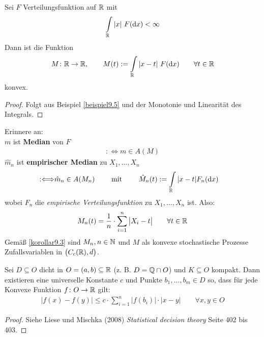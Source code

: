 \begin{lemma}\label{lemma9.6}
	Sei $F$ Verteilungsfunktion auf $\mathbb{R}$ mit
	\begin{align*}
		\int\limits_{\mathbb{R}} |x|~F(\mathrm{d} x)<\infty
	\end{align*}
	Dann ist die Funktion
	\begin{align*}
		M\colon\mathbb{R}\to\mathbb{R},\qquad M(t):=\int\limits_{\mathbb{R}}|x-t|~F(\mathrm{d} x)\qquad\forall t\in\mathbb{R}
	\end{align*}
	konvex.
\end{lemma}

\begin{proof}
	Folgt aus Beispiel \ref{beispiel9.5} und der Monotonie und Linearität des Integrals.
\end{proof}

Erinnere an:\\
$m$ ist \textbf{Median} von $F$
\begin{align*}
	:\Longleftrightarrow m\in A(M)
\end{align*}
$\hat{m}_n$ ist \textbf{empirischer Median} zu $X_1,\ldots,X_n$
\begin{align*}
	:\Longleftrightarrow&\hat{m}_n\in A(M_n)
	\qquad\text{ mit }\qquad
	\hat{M}_n(t):=\int\limits_{\mathbb{R}}|x-t| F_n(\mathrm{d} x)
\end{align*}
wobei $F_n$ die \textit{empirische Verteilungsfunktion} zu $X_1,\ldots,X_n$ ist.
Also:
\begin{align*}
	M_n(t)=\frac{1}{n}\cdot\sum\limits_{i=1}^n\big|X_i-t\big|\qquad\forall t\in\mathbb{R}
\end{align*}
Gemäß \ref{korollar9.3} sind $M_n,n\in\mathbb{N}$ und $M$ als	 konvexe stochastische Prozesse Zufallsvariablen in $\big(C_c(\mathbb{R}),d\big)$.

\begin{satz}\label{satz9.7}
	Sei $D\subseteq O$ dicht in $O=(a,b)\subseteq\mathbb{R}$ (z. B. $D=\mathbb{Q}\cap O$) und $K\subseteq O$ kompakt.
	Dann existieren eine universelle Konstante $c$ und Punkte $b_1,\ldots,b_m\in D$ so, dass für jede Konvexe Funktion $f\colon O\to\mathbb{R}$ gilt:
	\begin{align*}
		\big|f(x)-f(y)\big|\leq c\cdot\sum\limits_{i=1}^n\big|f(b_i)\big|\cdot|x-y|\qquad\forall x,y\in O
	\end{align*}
\end{satz}

\begin{proof}
	Siehe Liese und Mischka (2008) \textit{Statistical decision theory} Seite 402 bis 403.
\end{proof}



